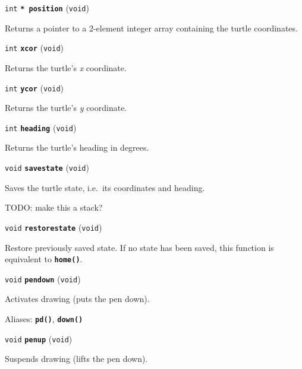 \documentclass[a4paper,11pt]{article}
\newcommand{\V}{\texttt{void}}      %
\newcommand{\I}{\texttt{int}}       %
\newcommand{\func}[1]{\textbf{\texttt{#1}}}  %
\newcommand{\A}[1]{\emph{#1}}       %
\newenvironment{bgi}
{ %
  \begin{snugshade}
}
{ %
  \end{snugshade}
}
\begin{document}

\begin{bgi}
\I{} \func{* position} (\V{})
\end{bgi}

Returns a pointer to a 2-element integer array containing the turtle
coordinates.


\begin{bgi}
\I{} \func{xcor} (\V{})
\end{bgi}

Returns the turtle's \A{x} coordinate.


\begin{bgi}
\I{} \func{ycor} (\V{})
\end{bgi}

Returns the turtle's \A{y} coordinate.


\begin{bgi}
\I{} \func{heading} (\V{})
\end{bgi}

Returns the turtle's heading in degrees.


\begin{bgi}
\V{} \func{savestate} (\V{})
\end{bgi}

Saves the turtle state, i.e.\ its coordinates and heading.

TODO: make this a stack?


\begin{bgi}
\V{} \func{restorestate} (\V{})
\end{bgi}

Restore previously saved state. If no state has been saved, this
function is equivalent to \func{home()}.


\begin{bgi}
\V{} \func{pendown} (\V{})
\end{bgi}

Activates drawing (puts the pen down).

Aliases: \func{pd()}, \func{down()}


\begin{bgi}
\V{} \func{penup} (\V{})
\end{bgi}

Suspends drawing (lifts the pen down).
\end{document}
